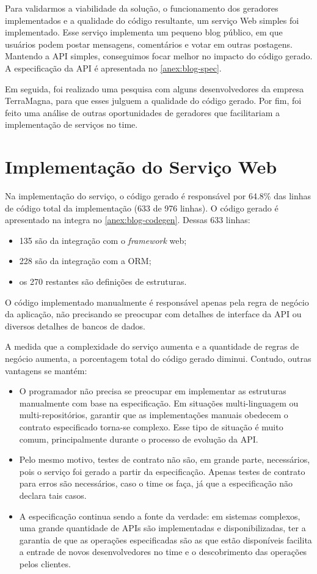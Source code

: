 Para validarmos a viabilidade da solução, o funcionamento dos geradores implementados e
a qualidade do código resultante, um serviço Web simples foi implementado. Esse serviço
implementa um pequeno blog público, em que usuários podem postar mensagens, comentários
e votar em outras postagens. Mantendo a API simples, conseguimos focar melhor no impacto
do código gerado. A especificação da API é apresentada no \cref{anex:blog-spec}.

Em seguida, foi realizado uma pesquisa com alguns desenvolvedores da empresa TerraMagna,
para que esses julguem a qualidade do código gerado. Por fim, foi feito uma análise de
outras oportunidades de geradores que facilitariam a implementação de serviços no time.

\section{Implementação do Serviço Web}

Na implementação do serviço, o código gerado é responsável por 64.8\% das linhas de código
total da implementação (633 de 976 linhas). O código gerado é apresentado na integra no
\cref{anex:blog-codegen}. Dessas 633 linhas:

\begin{itemize}
\item 135 são da integração com o \textit{framework} web;
\item 228 são da integração com a ORM;
\item os 270 restantes são definições de estruturas.
\end{itemize}

O código implementado manualmente é responsável apenas pela regra de negócio da aplicação,
não precisando se preocupar com detalhes de interface da API ou diversos detalhes de
bancos de dados.

A medida que a complexidade do serviço aumenta e a quantidade de regras de negócio aumenta,
a porcentagem total do código gerado diminui. Contudo, outras vantagens se mantém:

\begin{itemize}
\item O programador não precisa se preocupar em implementar as estruturas manualmente com
  base na especificação. Em situações multi-linguagem ou multi-repositórios, garantir que
  as implementações manuais obedecem o contrato especificado torna-se complexo. Esse tipo
  de situação é muito comum, principalmente durante o processo de evolução da API.
\item Pelo mesmo motivo, testes de contrato não são, em grande parte, necessários, pois o
  serviço foi gerado a partir da especificação. Apenas testes de contrato para erros são
  necessários, caso o time os faça, já que a especificação não declara tais casos.
\item A especificação continua sendo a fonte da verdade: em sistemas complexos, uma grande
  quantidade de APIs são implementadas e disponibilizadas, ter a garantia de que as operações
  especificadas são as que estão disponíveis facilita a entrade de novos desenvolvedores no
  time e o descobrimento das operações pelos clientes.
\end{itemize}

